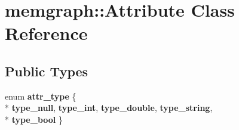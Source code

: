 \hypertarget{classmemgraph_1_1_attribute}{}\section{memgraph\+:\+:Attribute Class Reference}
\label{classmemgraph_1_1_attribute}
\subsection*{Public Types}
\begin{DoxyCompactItemize}
\item 
enum {\bfseries attr\+\_\+type} \{ \\*
{\bfseries type\+\_\+null}, 
{\bfseries type\+\_\+int}, 
{\bfseries type\+\_\+double}, 
{\bfseries type\+\_\+string}, 
\\*
{\bfseries type\+\_\+bool}
 \}\hypertarget{classmemgraph_1_1_attribute_acb9cb25b32254e1158279482981838c4}{}\label{classmemgraph_1_1_attribute_acb9cb25b32254e1158279482981838c4}

\end{DoxyCompactItemize}
